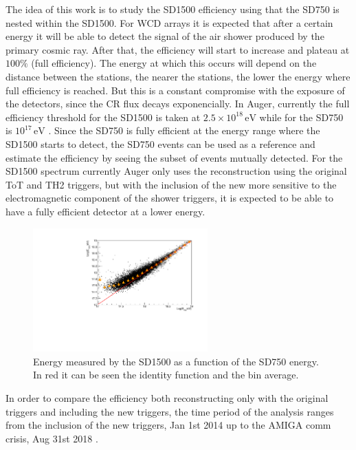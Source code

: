 \documentclass[12pt,a4paper]{article}
\newcommand{\eV}{\, \mathrm{eV}}
\begin{document}
The idea of this work is to study the SD1500 efficiency using that the SD750 is nested within the SD1500. For WCD arrays it is expected that after a certain energy it will be able to detect the signal of the air shower produced by the primary cosmic ray. After that, the efficiency will start to increase and plateau at $100\%$ (full efficiency). The energy at which this occurs will depend on the distance between the stations, the nearer the stations, the lower the energy where full efficiency is reached. But this is a constant compromise with the exposure of the detectors, since the CR flux decays exponencially. In Auger, currently the full efficiency threshold for the SD1500 is taken at $2.5\times10^{18}\eV$ while for the SD750 is $10^{17}\eV$ \cite{SD750Spectrum}. Since the SD750 is fully efficient at the energy range where the SD1500 starts to detect, the SD750 events can be used as a reference and estimate the efficiency by seeing the subset of events mutually detected. For the SD1500 spectrum currently Auger only uses the reconstruction using the original ToT and TH2 triggers, but with the inclusion of the new more sensitive to the electromagnetic component of the shower triggers, it is expected to be able to have a fully efficient detector at a lower energy. 

\begin{figure}[H]
    \begin{center}
        \includegraphics[width=0.6\textwidth]{plots/energy45.pdf}  
        \caption{Energy measured by the SD1500 as a function of the SD750 energy. In red it can be seen the identity function and the bin average.
        \label{fig:energy}}
        \vspace{-0.5cm}
    \end{center}
\end{figure} 


In order to compare the efficiency both reconstructing only with the original triggers and including the new triggers, the time period of the analysis ranges from the inclusion of the new triggers, Jan 1st 2014 up to the AMIGA comm crisis, Aug 31st 2018 \cite{GAPAmigaComms}.
\end{document}

